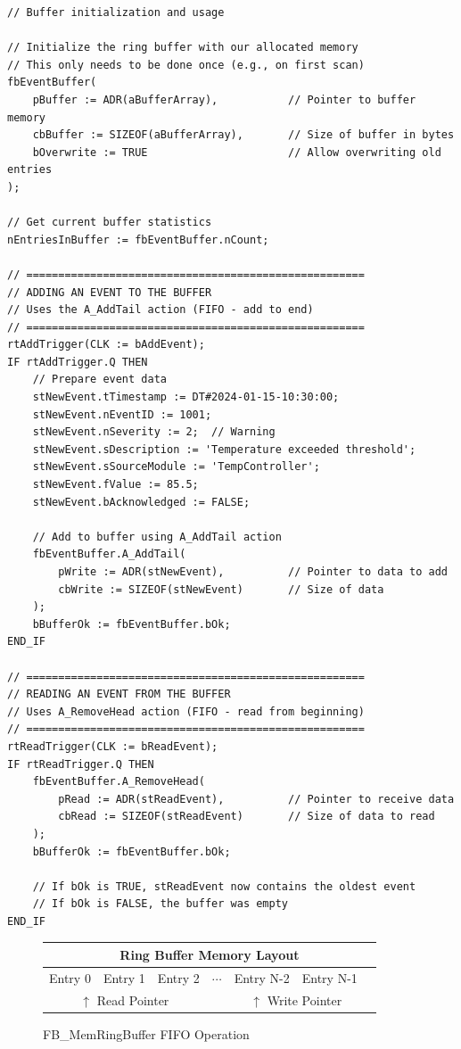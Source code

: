 \documentclass[11pt,a4paper]{article}
\begin{document}
\begin{lstlisting}
// Buffer initialization and usage

// Initialize the ring buffer with our allocated memory
// This only needs to be done once (e.g., on first scan)
fbEventBuffer(
    pBuffer := ADR(aBufferArray),           // Pointer to buffer memory
    cbBuffer := SIZEOF(aBufferArray),       // Size of buffer in bytes
    bOverwrite := TRUE                      // Allow overwriting old entries
);

// Get current buffer statistics
nEntriesInBuffer := fbEventBuffer.nCount;

// =====================================================
// ADDING AN EVENT TO THE BUFFER
// Uses the A_AddTail action (FIFO - add to end)
// =====================================================
rtAddTrigger(CLK := bAddEvent);
IF rtAddTrigger.Q THEN
    // Prepare event data
    stNewEvent.tTimestamp := DT#2024-01-15-10:30:00;
    stNewEvent.nEventID := 1001;
    stNewEvent.nSeverity := 2;  // Warning
    stNewEvent.sDescription := 'Temperature exceeded threshold';
    stNewEvent.sSourceModule := 'TempController';
    stNewEvent.fValue := 85.5;
    stNewEvent.bAcknowledged := FALSE;
    
    // Add to buffer using A_AddTail action
    fbEventBuffer.A_AddTail(
        pWrite := ADR(stNewEvent),          // Pointer to data to add
        cbWrite := SIZEOF(stNewEvent)       // Size of data
    );
    bBufferOk := fbEventBuffer.bOk;
END_IF

// =====================================================
// READING AN EVENT FROM THE BUFFER
// Uses A_RemoveHead action (FIFO - read from beginning)
// =====================================================
rtReadTrigger(CLK := bReadEvent);
IF rtReadTrigger.Q THEN
    fbEventBuffer.A_RemoveHead(
        pRead := ADR(stReadEvent),          // Pointer to receive data
        cbRead := SIZEOF(stReadEvent)       // Size of data to read
    );
    bBufferOk := fbEventBuffer.bOk;
    
    // If bOk is TRUE, stReadEvent now contains the oldest event
    // If bOk is FALSE, the buffer was empty
END_IF
\end{lstlisting}

\begin{figure}[h]
\centering
\begin{tabular}{|c|c|c|c|c|c|c|c|}
\hline
\multicolumn{8}{|c|}{\textbf{Ring Buffer Memory Layout}} \\
\hline
Entry 0 & Entry 1 & Entry 2 & $\cdots$ & Entry N-2 & Entry N-1 & \multicolumn{2}{c|}{} \\
\hline
\multicolumn{3}{|c|}{$\uparrow$ Read Pointer} & & \multicolumn{2}{c|}{$\uparrow$ Write Pointer} & \multicolumn{2}{c|}{} \\
\hline
\end{tabular}
\caption{FB\_MemRingBuffer FIFO Operation}
\end{figure}
\end{document}

